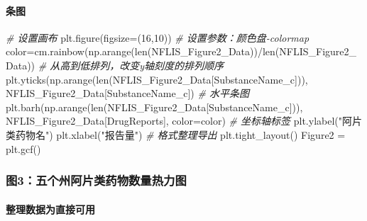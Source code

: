 \documentclass[
]{article}
\newenvironment{Shaded}{}{}
\newcommand{\BuiltInTok}[1]{#1}
\newcommand{\CommentTok}[1]{\textcolor[rgb]{0.38,0.63,0.69}{\textit{#1}}}
\newcommand{\DecValTok}[1]{\textcolor[rgb]{0.25,0.63,0.44}{#1}}
\newcommand{\NormalTok}[1]{#1}
\newcommand{\OperatorTok}[1]{\textcolor[rgb]{0.40,0.40,0.40}{#1}}
\newcommand{\StringTok}[1]{\textcolor[rgb]{0.25,0.44,0.63}{#1}}
\begin{document}
\hypertarget{header-n236}{%
\paragraph{条图}\label{header-n236}}

\begin{Shaded}
\begin{Highlighting}[]
\CommentTok{\# 设置画布}
\NormalTok{plt.figure(figsize}\OperatorTok{=}\NormalTok{(}\DecValTok{16}\NormalTok{,}\DecValTok{10}\NormalTok{))}
\CommentTok{\# 设置参数：颜色盘{-}colormap}
\NormalTok{color}\OperatorTok{=}\NormalTok{cm.rainbow(np.arange(}\BuiltInTok{len}\NormalTok{(NFLIS\_Figure2\_Data))}\OperatorTok{/}\BuiltInTok{len}\NormalTok{(NFLIS\_Figure2\_Data))}
\CommentTok{\# 从高到低排列，改变y轴刻度的排列顺序}
\NormalTok{plt.yticks(np.arange(}\BuiltInTok{len}\NormalTok{(NFLIS\_Figure2\_Data[}\StringTok{\textquotesingle{}SubstanceName\_c\textquotesingle{}}\NormalTok{])), NFLIS\_Figure2\_Data[}\StringTok{\textquotesingle{}SubstanceName\_c\textquotesingle{}}\NormalTok{])}
\CommentTok{\# 水平条图}
\NormalTok{plt.barh(np.arange(}\BuiltInTok{len}\NormalTok{(NFLIS\_Figure2\_Data[}\StringTok{\textquotesingle{}SubstanceName\_c\textquotesingle{}}\NormalTok{])), NFLIS\_Figure2\_Data[}\StringTok{\textquotesingle{}DrugReports\textquotesingle{}}\NormalTok{], color}\OperatorTok{=}\NormalTok{color)}
\CommentTok{\# 坐标轴标签}
\NormalTok{plt.ylabel(}\StringTok{"阿片类药物名"}\NormalTok{)}
\NormalTok{plt.xlabel(}\StringTok{"报告量"}\NormalTok{)}
\CommentTok{\# 格式整理导出}
\NormalTok{plt.tight\_layout()}
\NormalTok{Figure2 }\OperatorTok{=}\NormalTok{ plt.gcf()}
\end{Highlighting}
\end{Shaded}

\hypertarget{header-n241}{%
\subsubsection{图3：五个州阿片类药物数量热力图}\label{header-n241}}

\hypertarget{header-n242}{%
\paragraph{整理数据为直接可用}\label{header-n242}}
\end{document}
